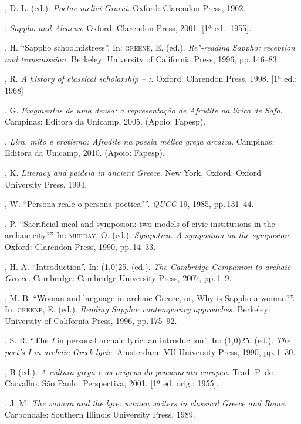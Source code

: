 \begin{bibliohedra}
, D. L. (ed.). \emph{Poetae melici Graeci.} Oxford: Clarendon
Press, 1962.

\titidem. \emph{Sappho and Alcaeus.} Oxford: Clarendon
Press, 2001. {[}1ª ed.: 1955{]}.

, H. “Sappho schoolmistress”. In: \textsc{greene}, E. (ed.).
\emph{Re"-reading Sappho: reception and transmission.} Berkeley: University of
California Press, 1996, pp.\,146--83.

, R. \emph{A history of classical scholarship -- \textsc{i}.} Oxford:
Clarendon Press, 1998. {[}1ª ed.: 1968{]}

, G. \emph{Fragmentos de uma deusa: a representação de Afrodite
na lírica de Safo}. Campinas: Editora da Unicamp, 2005. (Apoio: Fapesp).

\titidem. \emph{Lira, mito e erotismo: Afrodite na poesia mélica grega
arcaica}. Campinas: Editora da Unicamp, 2010. (Apoio: Fapesp).

, K. \emph{Literacy and paideia in ancient Greece.} New York,
Oxford: Oxford University Press, 1994.

, W. “Persona reale o persona poetica?”. \emph{QUCC} 19, 1985,
pp.\,131--44.

, P. “Sacrificial meal and symposion: two models of
civic institutions in the archaic city?” In: \textsc{murray}, O. (ed.).
\emph{Sympotica. A symposium on the symposion.} Oxford: Clarendon Press,
1990, pp.\,14--33.

, H. A. “Introduction”. In: \line(1,0){25}.
(ed.). \emph{The Cambridge Companion to archaic Greece.} Cambridge: Cambridge
University Press, 2007, pp.\,1--9.

, M. B. “Woman and language in archaic Greece, or, Why is Sappho
a woman?”. In: \textsc{greene}, E. (ed.). \emph{Reading Sappho: contemporary
approaches.} Berkeley: University of California Press, 1996, pp.\,175--92.

, S. R. “The \emph{I} in personal archaic lyric: an
introduction”. In: \line(1,0){25}. (ed.). \emph{The poet’s I in archaic Greek
lyric.} Amsterdam: VU University Press, 1990, pp.\,1--30.

, B (ed.). \emph{A cultura grega e as origens do pensamento
europeu.} Trad. P. de Carvalho. São Paulo: Perspectiva, 2001. {[}1ª ed. orig.:
1955{]}.

, J. M. \emph{The woman and the lyre: women writers in
classical Greece and Rome}. Carbondale: Southern Illinois University Press,
1989.


\end{bibliohedra}
